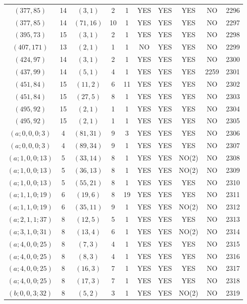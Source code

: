\begin{longtable}{|c|c|c|c|c|c|c|c|c|c|}
$(377, 85)$ & 14 & $(3, 1)$ & 2 & 1 & YES & YES & YES & NO & 2296\\
$(377, 85)$ & 14 & $(71, 16)$ & 10 & 1 & YES & YES & YES & NO & 2297\\
$(395, 73)$ & 15 & $(3, 1)$ & 2 & 1 & YES & YES & YES & NO & 2298\\
$(407, 171)$ & 13 & $(2, 1)$ & 1 & 1 & NO & YES & YES & NO & 2299\\
$(424, 97)$ & 14 & $(3, 1)$ & 2 & 1 & YES & YES & YES & NO & 2300\\
$(437, 99)$ & 14 & $(5, 1)$ & 4 & 1 & YES & YES & YES & 2259 & 2301\\
$(451, 84)$ & 15 & $(11, 2)$ & 6 & 11 & YES & YES & YES & NO & 2302\\
$(451, 84)$ & 15 & $(27, 5)$ & 8 & 1 & YES & YES & YES & NO & 2303\\
$(495, 92)$ & 15 & $(2, 1)$ & 1 & 1 & YES & YES & YES & NO & 2304\\
$(495, 92)$ & 15 & $(2, 1)$ & 1 & 1 & YES & YES & YES & NO & 2305\\
$(a; 0, 0, 0; 3)$ & 4 & $(81, 31)$ & 9 & 3 & YES & YES & YES & NO & 2306\\
$(a; 0, 0, 0; 3)$ & 4 & $(89, 34)$ & 9 & 1 & YES & YES & YES & NO & 2307\\
$(a; 1, 0, 0; 13)$ & 5 & $(33, 14)$ & 8 & 1 & YES & YES & NO(2) & NO & 2308\\
$(a; 1, 0, 0; 13)$ & 5 & $(36, 13)$ & 8 & 1 & YES & YES & NO(2) & NO & 2309\\
$(a; 1, 0, 0; 13)$ & 5 & $(55, 21)$ & 8 & 1 & YES & YES & YES & NO & 2310\\
$(a; 1, 1, 0; 19)$ & 6 & $(19, 6)$ & 8 & 19 & YES & YES & YES & NO & 2311\\
$(a; 1, 1, 0; 19)$ & 6 & $(35, 11)$ & 9 & 1 & YES & YES & NO(2) & NO & 2312\\
$(a; 2, 1, 1; 37)$ & 8 & $(12, 5)$ & 5 & 1 & YES & YES & YES & NO & 2313\\
$(a; 3, 1, 0; 31)$ & 8 & $(13, 4)$ & 6 & 1 & YES & YES & NO(2) & NO & 2314\\
$(a; 4, 0, 0; 25)$ & 8 & $(7, 3)$ & 4 & 1 & YES & YES & YES & NO & 2315\\
$(a; 4, 0, 0; 25)$ & 8 & $(8, 3)$ & 4 & 1 & YES & YES & YES & NO & 2316\\
$(a; 4, 0, 0; 25)$ & 8 & $(16, 3)$ & 7 & 1 & YES & YES & YES & NO & 2317\\
$(a; 4, 0, 0; 25)$ & 8 & $(17, 3)$ & 7 & 1 & YES & YES & YES & NO & 2318\\
$(b; 0, 0, 3; 32)$ & 8 & $(5, 2)$ & 3 & 1 & YES & YES & NO(2) & NO & 2319\\

\end{longtable}
